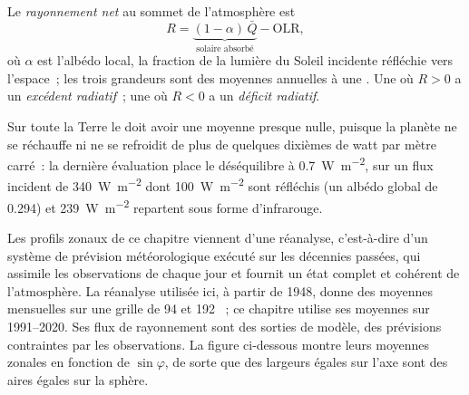 \begin{definition}\label{def:b1:radiation-heat-transport:net-radiation}
Le \emph{rayonnement net} au sommet de l'atmosphère est
\[
  R = \underbrace{(1 - \alpha)\,\bar Q}_{\text{solaire absorbé}} - \text{OLR},
\]
où $\alpha$ est l'albédo local, la fraction de la lumière du Soleil incidente réfléchie
vers l'espace~; les trois grandeurs sont des moyennes annuelles à une . Une  où
$R > 0$ a un \emph{excédent radiatif}~; une où $R < 0$
a un \emph{déficit radiatif}.
\end{definition}

Sur toute la Terre le  doit avoir une moyenne presque nulle, puisque la planète
ne se réchauffe ni ne se refroidit de plus de quelques dixièmes de watt par mètre carré~: la
dernière évaluation place le déséquilibre à \qty{0.7}{W.m^{-2}}, sur un flux incident de
\qty{340}{W.m^{-2}} dont \qty{100}{W.m^{-2}} sont réfléchis (un albédo global de
\num{0.294}) et \qty{239}{W.m^{-2}} repartent sous forme d'infrarouge.

Les profils zonaux de ce chapitre viennent d'une réanalyse, c'est-à-dire d'un système de
prévision météorologique exécuté sur les décennies passées, qui assimile les observations de
chaque jour et fournit un état complet et cohérent de l'atmosphère. La
réanalyse utilisée ici, à partir de 1948, donne des moyennes mensuelles sur une grille de 94 
et 192 ~; ce chapitre utilise ses moyennes sur 1991--2020. Ses flux de rayonnement
sont des sorties de modèle, des prévisions contraintes par les observations. La figure
ci-dessous montre leurs moyennes zonales en fonction de $\sin\varphi$, de sorte que des largeurs égales sur
l'axe sont des aires égales sur la sphère.

